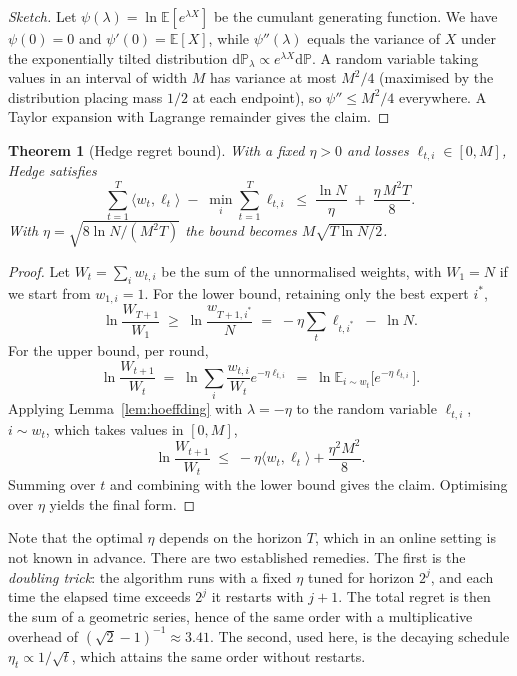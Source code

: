 \documentclass[12pt,a4paper,oneside]{report}
\renewcommand{\_}{\oldunderscore\allowbreak}
\theoremstyle{definition}
\theoremstyle{plain}
\newtheorem{theorem}{Theorem}[chapter]
\theoremstyle{remark}
\begin{document}
\begin{proof}[Sketch]
Let $\psi(\lambda) = \ln\mathbb{E}[e^{\lambda X}]$ be the cumulant generating function. We have
$\psi(0)=0$ and $\psi'(0)=\mathbb{E}[X]$, while $\psi''(\lambda)$ equals the variance of $X$
under the exponentially tilted distribution $\mathrm{d}\mathbb{P}_\lambda \propto e^{\lambda X}
\mathrm{d}\mathbb{P}$. A random variable taking values in an interval of width $M$ has variance
at most $M^2/4$ (maximised by the distribution placing mass $1/2$ at each endpoint), so
$\psi''\leq M^2/4$ everywhere. A Taylor expansion with Lagrange remainder gives the claim.
\end{proof}

\begin{theorem}[Hedge regret bound]
\label{thm:hedge}
With a fixed $\eta>0$ and losses $\ell_{t,i}\in[0,M]$, Hedge satisfies
\[
\sum_{t=1}^{T}\langle w_t, \ell_t\rangle \;-\; \min_i \sum_{t=1}^{T}\ell_{t,i}
\;\leq\; \frac{\ln N}{\eta} \;+\; \frac{\eta\, M^2 T}{8}.
\]
With $\eta = \sqrt{8\ln N/(M^2T)}$ the bound becomes $M\sqrt{T \ln N / 2}$.
\end{theorem}

\begin{proof}
Let $W_t = \sum_i w_{t,i}$ be the sum of the unnormalised weights, with $W_1 = N$ if we start
from $w_{1,i}=1$. For the lower bound, retaining only the best expert $i^*$,
\[
\ln \frac{W_{T+1}}{W_1} \;\geq\; \ln \frac{w_{T+1,i^*}}{N}
\;=\; -\eta \sum_{t} \ell_{t,i^*} \;-\; \ln N .
\]
For the upper bound, per round,
\[
\ln \frac{W_{t+1}}{W_t} \;=\; \ln \sum_i \frac{w_{t,i}}{W_t} e^{-\eta \ell_{t,i}}
\;=\; \ln \mathbb{E}_{i\sim w_t}\big[e^{-\eta \ell_{t,i}}\big].
\]
Applying Lemma~\ref{lem:hoeffding} with $\lambda=-\eta$ to the random variable $\ell_{t,i}$,
$i\sim w_t$, which takes values in $[0,M]$,
\[
\ln \frac{W_{t+1}}{W_t} \;\leq\; -\eta \langle w_t, \ell_t\rangle + \frac{\eta^2 M^2}{8}.
\]
Summing over $t$ and combining with the lower bound gives the claim. Optimising over $\eta$
yields the final form.
\end{proof}

Note that the optimal $\eta$ depends on the horizon $T$, which in an online setting is not
known in advance. There are two established remedies. The first is the \emph{doubling trick}:
the algorithm runs with a fixed $\eta$ tuned for horizon $2^j$, and each time the elapsed time
exceeds $2^j$ it restarts with $j\!+\!1$. The total regret is then the sum of a geometric
series, hence of the same order with a multiplicative overhead of
$(\sqrt{2}-1)^{-1}\!\approx\!3.41$. The second, used here, is the decaying schedule
$\eta_t \propto 1/\sqrt{t}$, which attains the same order without restarts.
\end{document}
